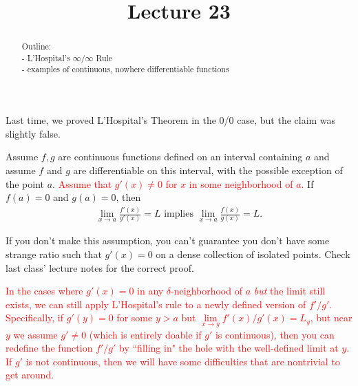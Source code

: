 \documentclass{ximera}
\begin{document}
    \title{Lecture 23}
    
    \begin{abstract}  
    Outline: \\
    - L'Hospital's $\infty/\infty$ Rule \\
    - examples of continuous, nowhere differentiable functions
\end{abstract}

\maketitle

Last time, we proved L'Hospital's Theorem in the 0/0 case, but the claim was slightly false.
    \begin{theorem}
        Assume $f, g$ are continuous functions defined on an interval containing $a$ and assume $f$ and $g$ are differentiable on this interval, with the possible exception of the point $a$. \textcolor{red}{Assume that $g'(x) \neq 0$ for $x$ in some neighborhood of $a$.}  If $f(a) = 0$ and $g(a) = 0$, then
        \begin{align*}
            \lim\limits_{x\to a} \frac{f'(x)}{g'(x)} = L \text{ implies } \lim\limits_{x\to a} \frac{f(x)}{g(x)} = L.
         \end{align*}
    \end{theorem}

If you don't make this assumption, you can't guarantee you don't have some strange ratio such that $g'(x) = 0$ on a dense collection of isolated points.  Check last class' lecture notes for the correct proof.

\textcolor{red}{In the cases where $g'(x) = 0$ in any $\delta$-neighborhood of $a$ \textit{but} the limit still exists, we can still apply L'Hospital's rule to a newly defined version of $f'/g'$.  Specifically, if $g'(y)= 0$ for some $y>a$ but $\lim\limits_{x\to y} f'(x)/g'(x) = L_y$, but  near $y$ we assume $g' \neq 0$ (which is entirely doable if $g'$ is continuous), then you can redefine the function $f'/g'$ by ``filling in" the hole with the well-defined limit at $y$.  If $g'$ is not continuous, then we will have some difficulties that are nontrivial to get around.}
\end{document}
